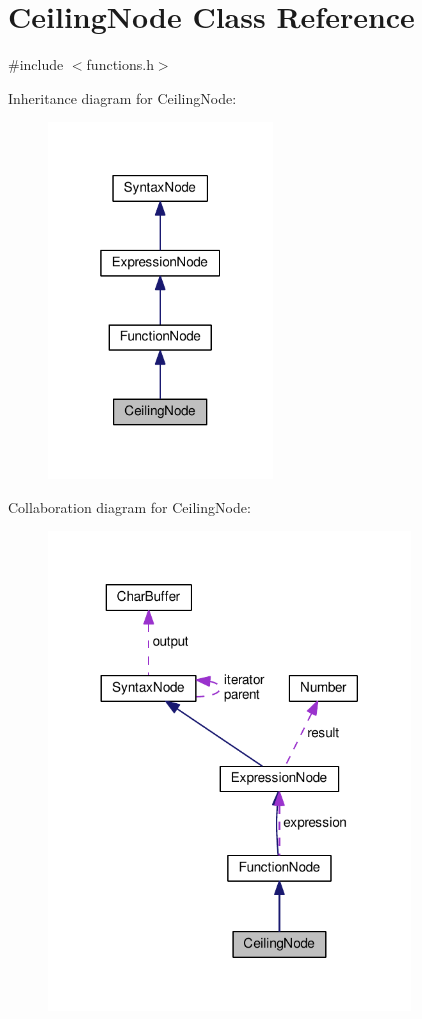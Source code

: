 \hypertarget{classCeilingNode}{}\section{Ceiling\+Node Class Reference}
\label{classCeilingNode}


{\ttfamily \#include $<$functions.\+h$>$}



Inheritance diagram for Ceiling\+Node\+:\nopagebreak
\begin{figure}[H]
\begin{center}
\leavevmode
\includegraphics[width=169pt]{classCeilingNode__inherit__graph}
\end{center}
\end{figure}


Collaboration diagram for Ceiling\+Node\+:\nopagebreak
\begin{figure}[H]
\begin{center}
\leavevmode
\includegraphics[width=272pt]{classCeilingNode__coll__graph}
\end{center}
\end{figure}
